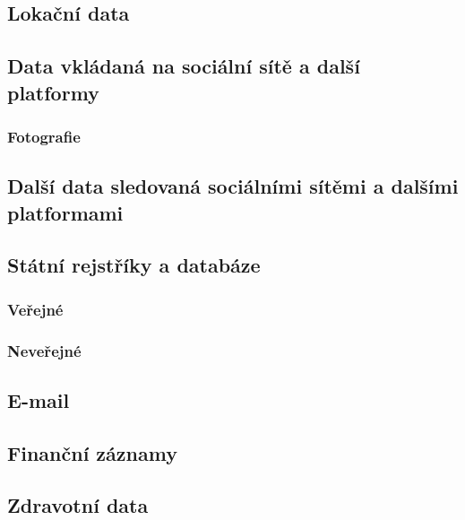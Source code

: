 \subsection{Lokační data}

\subsection{Data vkládaná na sociální sítě a další platformy}
\subsubsection{Fotografie}

\subsection{Další data sledovaná sociálními sítěmi a dalšími platformami}

\subsection{Státní rejstříky a databáze}
\subsubsection{Veřejné}
\subsubsection{Neveřejné}

\subsection{E-mail}

\subsection{Finanční záznamy}

\subsection{Zdravotní data}